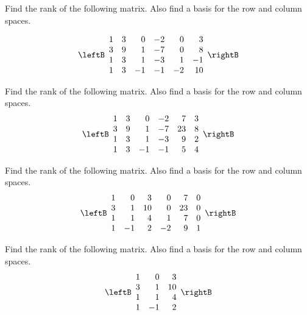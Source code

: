 \begin{enumialphparenastyle}

\begin{ex} Find the rank of the following matrix. Also find a basis for the row
and column spaces.

\begin{equation*}
\leftB 
\begin{array}{rrrrrr}
1 & 3 & 0 & -2 & 0 & 3 \\ 
3 & 9 & 1 & -7 & 0 & 8 \\ 
1 & 3 & 1 & -3 & 1 & -1 \\ 
1 & 3 & -1 & -1 & -2 & 10
\end{array}
\rightB 
\end{equation*}
\end{ex}

\begin{ex} Find the rank of the following matrix. Also find a basis for the row
and column spaces.
\begin{equation*}
\leftB 
\begin{array}{rrrrrr}
1 & 3 & 0 & -2 & 7 & 3 \\ 
3 & 9 & 1 & -7 & 23 & 8 \\ 
1 & 3 & 1 & -3 & 9 & 2 \\ 
1 & 3 & -1 & -1 & 5 & 4
\end{array}
\rightB 
\end{equation*}
\end{ex}

\begin{ex} Find the rank of the following matrix. Also find a basis for the row
and column spaces.
\begin{equation*}
\leftB 
\begin{array}{rrrrrr}
1 & 0 & 3 & 0 & 7 & 0 \\ 
3 & 1 & 10 & 0 & 23 & 0 \\ 
1 & 1 & 4 & 1 & 7 & 0 \\ 
1 & -1 & 2 & -2 & 9 & 1
\end{array}
\rightB
\end{equation*}
\end{ex}

\begin{ex} Find the rank of the following matrix. Also find a basis for the row
and column spaces. 
\begin{equation*}
\leftB 
\begin{array}{rrr}
1 & 0 & 3 \\ 
3 & 1 & 10 \\ 
1 & 1 & 4 \\ 
1 & -1 & 2
\end{array}
\rightB
\end{equation*}
\end{ex}


\end{enumialphparenastyle}
